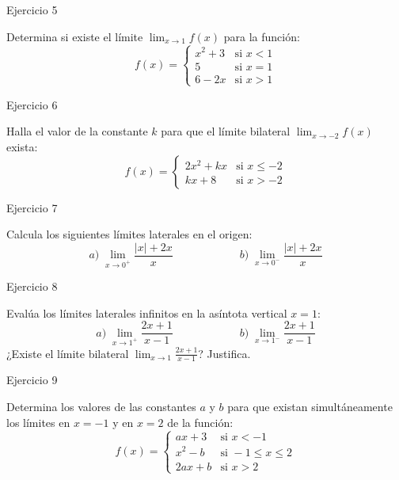 \documentclass[aspectratio=169]{beamer}
\begin{document}
\begin{frame}{Ejercicio 5}
  \begin{mwejercicio}
    Determina si existe el límite $\lim_{x \to 1} f(x)$ para la función:
    $$f(x) = \begin{cases} x^2 + 3 & \text{si } x < 1 \\ 5 & \text{si } x = 1 \\ 6 - 2x & \text{si } x > 1 \end{cases}$$
  \end{mwejercicio}
  \vspace{3.5cm}
\end{frame}
\begin{frame}{Ejercicio 6}
  \begin{mwejercicio}
    Halla el valor de la constante $k$ para que el límite bilateral $\lim_{x \to -2} f(x)$ exista:
    $$f(x) = \begin{cases} 2x^2 + kx & \text{si } x \le -2 \\ kx + 8 & \text{si } x > -2 \end{cases}$$
  \end{mwejercicio}
  \vspace{3.5cm}
\end{frame}
\begin{frame}{Ejercicio 7}
  \begin{mwejercicio}
    Calcula los siguientes límites laterales en el origen:
    $$a)\; \lim_{x \to 0^+} \frac{|x| + 2x}{x} \qquad\qquad\qquad b)\; \lim_{x \to 0^-} \frac{|x| + 2x}{x}$$
  \end{mwejercicio}
  \vspace{3.5cm}
\end{frame}
\begin{frame}{Ejercicio 8}
  \begin{mwejercicio}
    Evalúa los límites laterales infinitos en la asíntota vertical $x = 1$:
    $$a)\; \lim_{x \to 1^+} \frac{2x + 1}{x - 1} \qquad\qquad\qquad b)\; \lim_{x \to 1^-} \frac{2x + 1}{x - 1}$$
    ¿Existe el límite bilateral $\lim_{x \to 1} \frac{2x + 1}{x - 1}$? Justifica.
  \end{mwejercicio}
  \vspace{3.5cm}
\end{frame}
\begin{frame}{Ejercicio 9}
  \begin{mwejercicio}
    Determina los valores de las constantes $a$ y $b$ para que existan simultáneamente los límites en $x = -1$ y en $x = 2$ de la función:
    $$f(x) = \begin{cases}
      ax + 3 & \text{si } x < -1 \\
      x^2 - b & \text{si } -1 \le x \le 2 \\
      2ax + b & \text{si } x > 2
    \end{cases}$$
  \end{mwejercicio}
  \vspace{2.5cm}
\end{frame}
\end{document}
